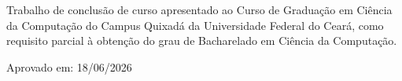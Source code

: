 \newcommand{\membroa}{\orientador\space(Orientador) \\ Universidade Federal do Ceará (UFC)}
\newcommand{\membrob}{Prof. Dr. Jefferson de Carvalho Silva \\ Universidade Federal do Ceará (UFC)}
\newcommand{\membroc}{Prof. Dr. Paulo Henrique Macedo de Araujo \\ Universidade Federal do Ceará (UFC)}
\newcommand{\membrod}{Prof. Dr. Nome Completo do Professor Externo \\ Universidade Externa} %
\newcommand{\dataaprovacao}{18/06/2026}
\begin{titlepage}
    \centering

    {\autor \par}
    \vspace{3cm}

    {\titulodtcc \par}

    \ifdefined\subtitulo
    {\vspace{0.5cm}\subtitulo \par}
    \fi
    \vspace{2cm}

    \begin{flushright}
        \begin{minipage}{0.5\textwidth}
            \begin{flushleft}
                \justifying
                \singlespacing
                \normalsize
                Trabalho de conclusão de curso apresentado ao Curso de Graduação em Ciência da Computação do Campus Quixadá da Universidade Federal do Ceará, como requisito parcial à obtenção do grau de Bacharelado em Ciência da Computação.
            \end{flushleft}
        \end{minipage}
    \end{flushright}
    \vspace{0.5cm}

    \begin{flushleft}
        \singlespacing
        \normalsize
        Aprovado em: \dataaprovacao \par
        \vspace{1cm}
    \end{flushleft}


\end{titlepage}
